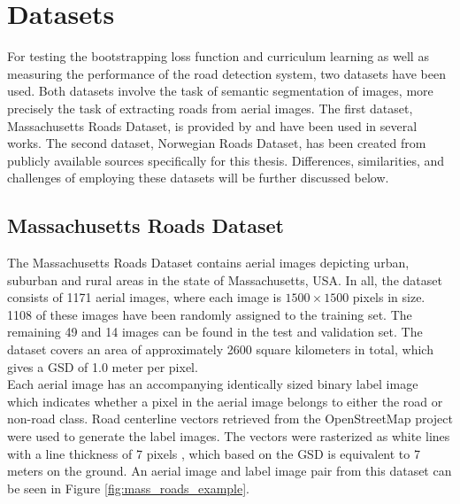 \section{Datasets}
\label{sec:datasets}
For testing the bootstrapping loss function and curriculum learning as well as measuring the performance of the road detection system, two datasets have been used. Both datasets involve the task of semantic segmentation of images, more precisely the task of extracting roads from aerial images. The first dataset, Massachusetts Roads Dataset, is provided by \cite{MnihThesis} and have been used in several works. The second dataset, Norwegian Roads Dataset, has been created from publicly available sources specifically for this thesis. Differences, similarities, and challenges of employing these datasets will be further discussed below.\\

\subsection{Massachusetts Roads Dataset}
The Massachusetts Roads Dataset contains aerial images depicting urban, suburban and rural areas in the state of Massachusetts, USA. In all, the dataset consists of 1171 aerial images, where each image is $1500\times 1500$ pixels in size. 1108 of these images have been randomly assigned to the training set. The remaining 49 and 14 images can be found in the test and validation set. The dataset covers an area of approximately 2600 square kilometers in total, which gives a \ac{GSD} of 1.0 meter per pixel.\\

Each aerial image has an accompanying identically sized binary label image which indicates whether a pixel in the aerial image belongs to either the road or non-road class. Road centerline vectors retrieved from the OpenStreetMap project were used to generate the label images. The vectors were rasterized as white lines with a line thickness of 7 pixels \citep{MnihThesis}, which based on the \ac{GSD} is equivalent to 7 meters on the ground. An aerial image and label image pair from this dataset can be seen in Figure \ref{fig:mass_roads_example}.\\

